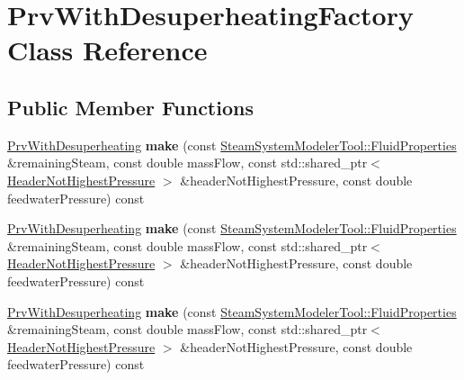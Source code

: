 \hypertarget{class_prv_with_desuperheating_factory}{}\section{Prv\+With\+Desuperheating\+Factory Class Reference}
\label{class_prv_with_desuperheating_factory}
\subsection*{Public Member Functions}
\begin{DoxyCompactItemize}
\item 
\mbox{\label{class_prv_with_desuperheating_factory_a7b5e19f6bf614e0d1ae43fb3dd0478ac}} 
\hyperlink{class_prv_with_desuperheating}{Prv\+With\+Desuperheating} {\bfseries make} (const \hyperlink{struct_steam_system_modeler_tool_1_1_fluid_properties}{Steam\+System\+Modeler\+Tool\+::\+Fluid\+Properties} \&remaining\+Steam, const double mass\+Flow, const std\+::shared\+\_\+ptr$<$ \hyperlink{class_header_not_highest_pressure}{Header\+Not\+Highest\+Pressure} $>$ \&header\+Not\+Highest\+Pressure, const double feedwater\+Pressure) const
\item 
\mbox{\label{class_prv_with_desuperheating_factory_a7b5e19f6bf614e0d1ae43fb3dd0478ac}} 
\hyperlink{class_prv_with_desuperheating}{Prv\+With\+Desuperheating} {\bfseries make} (const \hyperlink{struct_steam_system_modeler_tool_1_1_fluid_properties}{Steam\+System\+Modeler\+Tool\+::\+Fluid\+Properties} \&remaining\+Steam, const double mass\+Flow, const std\+::shared\+\_\+ptr$<$ \hyperlink{class_header_not_highest_pressure}{Header\+Not\+Highest\+Pressure} $>$ \&header\+Not\+Highest\+Pressure, const double feedwater\+Pressure) const
\item 
\mbox{\label{class_prv_with_desuperheating_factory_a7b5e19f6bf614e0d1ae43fb3dd0478ac}} 
\hyperlink{class_prv_with_desuperheating}{Prv\+With\+Desuperheating} {\bfseries make} (const \hyperlink{struct_steam_system_modeler_tool_1_1_fluid_properties}{Steam\+System\+Modeler\+Tool\+::\+Fluid\+Properties} \&remaining\+Steam, const double mass\+Flow, const std\+::shared\+\_\+ptr$<$ \hyperlink{class_header_not_highest_pressure}{Header\+Not\+Highest\+Pressure} $>$ \&header\+Not\+Highest\+Pressure, const double feedwater\+Pressure) const
\end{DoxyCompactItemize}


